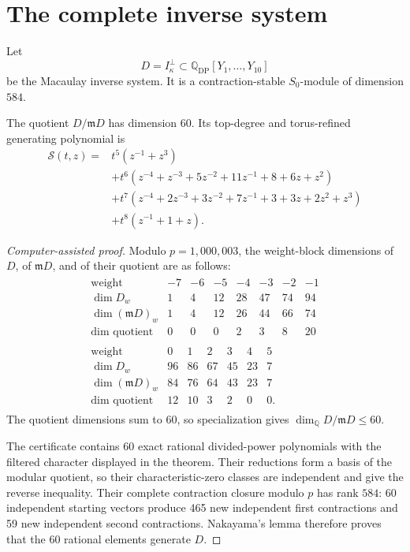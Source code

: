 \documentclass[11pt,reqno]{amsart}
\begin{document}
\section{The complete inverse system}
\label{sec:inverse}

Let
\[
D=I_\kappa^\perp
\subset\mathbb Q_{\mathrm{DP}}[Y_1,\ldots,Y_{10}]
\]
be the Macaulay inverse system.  It is a contraction-stable
\(S_0\)-module of dimension \(584\).

\begin{theorem}
\label{thm:inverse}
The quotient \(D/\mathfrak mD\) has dimension \(60\).  Its top-degree and
torus-refined generating polynomial is
\begin{align*}
\mathcal S(t,z)={}&t^5(z^{-1}+z^3)\\
&+t^6(z^{-4}+z^{-3}+5z^{-2}+11z^{-1}+8+6z+z^2)\\
&+t^7(z^{-4}+2z^{-3}+3z^{-2}+7z^{-1}+3+3z+2z^2+z^3)\\
&+t^8(z^{-1}+1+z).
\end{align*}
\end{theorem}

\begin{proof}[Computer-assisted proof]
Modulo \(p=1{,}000{,}003\), the weight-block dimensions of \(D\), of
\(\mathfrak mD\), and of their quotient are as follows:
\[
\begin{gathered}
\begin{array}{c|rrrrrrr}
\text{weight}&-7&-6&-5&-4&-3&-2&-1\\ \hline
\dim D_w&1&4&12&28&47&74&94\\
\dim(\mathfrak mD)_w&1&4&12&26&44&66&74\\
\dim\text{ quotient}&0&0&0&2&3&8&20
\end{array}\\[6pt]
\begin{array}{c|rrrrrr}
\text{weight}&0&1&2&3&4&5\\ \hline
\dim D_w&96&86&67&45&23&7\\
\dim(\mathfrak mD)_w&84&76&64&43&23&7\\
\dim\text{ quotient}&12&10&3&2&0&0.
\end{array}
\end{gathered}
\]
The quotient dimensions sum to 60, so specialization gives
\(\dim_\mathbb Q D/\mathfrak mD\le60\).

The certificate contains 60 exact rational divided-power polynomials with
the filtered character displayed in the theorem.  Their reductions form a
basis of the modular quotient, so their characteristic-zero classes are
independent and give the reverse inequality.  Their complete contraction
closure modulo \(p\) has rank \(584\): 60 independent starting vectors
produce 465 new independent first contractions and 59 new independent second
contractions.  Nakayama's lemma therefore proves that the 60 rational
elements generate \(D\).
\end{proof}
\end{document}

